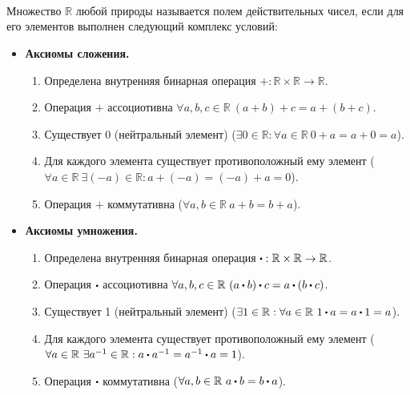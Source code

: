\documentclass{article}
\begin{document}
\section{\centering}
\noindent{}\\[0.2cm]
Множество \(\mathbb{R}\) любой природы называется полем действительных чисел, если для его элементов выполнен следующий комплекс условий:
\begin{itemize}[leftmargin=*]
    \item \textbf{Аксиомы сложения.}
    \begin{enumerate}[label=$\arabic*_{+}$]
        \item Определена внутренняя бинарная операция \(+: \mathbb{R} \times \mathbb{R} \to \mathbb{R}\).
        \item Операция \(+\) ассоциотивна \(\forall a, b, c \in \mathbb{R}\ (a + b) + c = a + (b + c)\).
        \item Существует 0 (нейтральный элемент) (\(\exists 0 \in \mathbb{R}: \forall a \in \mathbb{R}\ 0 + a = a + 0 = a\)).
        \item Для каждого элемента существует противоположный ему элемент (\(\forall a \in \mathbb{R}\ \exists (-a) \in \mathbb{R}: a + (-a) = (-a) + a = 0\)).
        \item Операция \(+\) коммутативна (\(\forall a, b \in \mathbb{R}\ a + b = b + a\)). 
    \end{enumerate}
    \item \textbf{Аксиомы умножения.}
    \begin{enumerate}[label=$\arabic*_{\dt}$]
        \item Определена внутренняя бинарная операция \(\dt: \mathbb{R} \times \mathbb{R} \to \mathbb{R} \).
        \item Операция \(\dt\) ассоциотивна \(\forall a, b, c \in \mathbb{R}\ (a \dt b) \dt c = a \dt (b \dt c)\).
        \item Существует 1 (нейтральный элемент) (\(\exists 1 \in \mathbb{R}: \forall a \in \mathbb{R}\ 1 \dt a = a \dt 1 = a\)).
        \item Для каждого элемента существует противоположный ему элемент (\(\forall a \in \mathbb{R}\ \exists a^{-1} \in \mathbb{R}: a \dt a^{-1} = a^{-1} \dt a = 1\)).
        \item Операция \(\dt\) коммутативна (\(\forall a, b \in \mathbb{R}\ a \dt b = b \dt a\)).

\end{enumerate}
\end{itemize}
\end{document}
